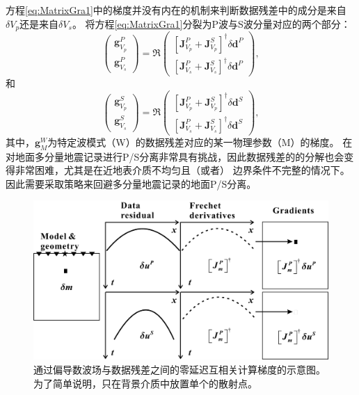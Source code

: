 方程\eqref{eq:MatrixGra1}中的梯度并没有内在的机制来判断数据残差中的成分是来自$\delta V_p$还是来自$\delta V_s$。
将方程\eqref{eq:MatrixGra1}分裂为P波与S波分量对应的两个部分：
\begin{equation}
        \begin{pmatrix}
                \mathbf{g}^P_{V_p}\\
                \mathbf{g}^P_{V_s}
        \end{pmatrix}
        =\mathfrak{R}\begin{pmatrix}
                [\mathbf{J}^P_{V_p}+\mathbf{J}^S_{V_p}]^{\dagger}\delta \mathbf{d}^P\\
                [\mathbf{J}^P_{V_s}+\mathbf{J}^S_{V_s}]^{\dagger}\delta \mathbf{d}^P
        \end{pmatrix},
        \label{eq:DEMatrixGraP}
\end{equation}
和
\begin{equation}
        \begin{pmatrix}
                \mathbf{g}^S_{V_p}\\
                \mathbf{g}^S_{V_s}
        \end{pmatrix}
        =\mathfrak{R}\begin{pmatrix}
                [\mathbf{J}^P_{V_p}+\mathbf{J}^S_{V_p}]^{\dagger}\delta \mathbf{d}^S\\
                [\mathbf{J}^P_{V_s}+\mathbf{J}^S_{V_s}]^{\dagger}\delta \mathbf{d}^S
        \end{pmatrix},
        \label{eq:DEMatrixGraS}
\end{equation}
其中，$\mathbf{g}^W_M$为特定波模式（W）的数据残差对应的某一物理参数（M）的梯度。
在对地面多分量地震记录进行P/S分离非常具有挑战，因此数据残差的的分解也会变得非常困难，尤其是在近地表介质不均匀且（或者）
边界条件不完整的情况下。因此需要采取策略来回避多分量地震记录的地面P/S分离。
\begin{figure}
    \begin{center}
        \includegraphics[width=1.0\textwidth]{Figure/chapter02/finalMarmousiII/Fig/zerolagLAST1.pdf}
        \caption{
			通过偏导数波场与数据残差之间的零延迟互相关计算梯度的示意图。为了简单说明，只在背景介质中放置单个的散射点。
    }
    \label{fig:crossterm}
    \end{center}
\end{figure}

